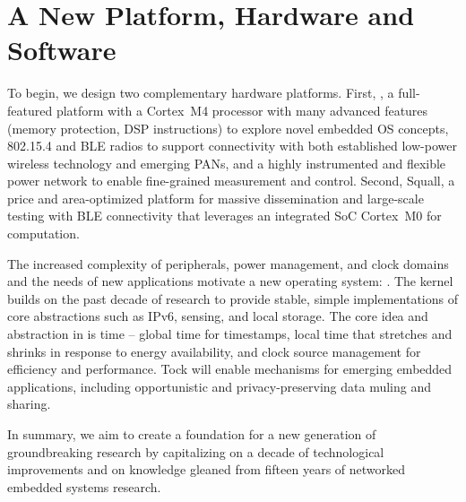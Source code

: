 \section{A New Platform, Hardware and Software}

To begin, we design two complementary hardware platforms. First, \namedevice,
a full-featured platform with a Cortex~M4 processor with many advanced
features (memory protection, DSP instructions) to explore novel embedded OS
concepts, 802.15.4 and BLE radios to support connectivity with both
established low-power wireless technology and emerging PANs, and a highly
instrumented and flexible power network to enable fine-grained measurement and
control. Second, Squall, a price and area-optimized platform for massive
dissemination and large-scale testing with BLE connectivity that leverages an
integrated SoC Cortex~M0 for computation.

The increased complexity of peripherals, power management, and clock
domains and the needs of new applications
motivate a new operating system: \nameos. The \nameos kernel builds
on the past decade of research to provide stable, simple implementations of
core abstractions such as IPv6, sensing, and local storage. 
The core idea and abstraction in \nameos is time -- global time for timestamps,
local time that stretches and shrinks in response to energy availability, and
clock source management for efficiency and performance.
Tock will enable mechanisms for emerging embedded applications,
including opportunistic and privacy-preserving data muling and sharing.

In summary, we aim to create a foundation for a new generation of
groundbreaking research by capitalizing on a decade of technological
improvements and on knowledge gleaned from fifteen years of
networked embedded systems research.




